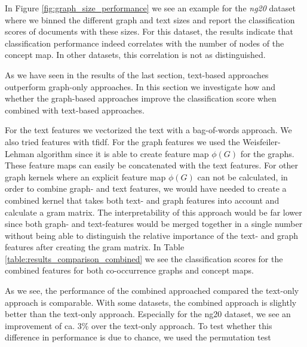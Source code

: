 In Figure \ref{fig:graph_size_performance} we see an example for the \textit{ng20} dataset where we binned the different graph and text sizes and report the classification scores of documents with these sizes.
For this dataset, the results indicate that classification performance indeed correlates with the number of nodes of the concept map.
In other datasets, this correlation is not as distinguished.





As we have seen in the results of the last section, text-based approaches outperform graph-only approaches.
In this section we investigate how and whether the graph-based approaches improve the classification score when combined with text-based approaches.

For the text features we vectorized the text with a bag-of-words approach. We also tried features with tfidf.
For the graph features we used the Weisfeiler-Lehman algorithm since it is able to create feature map $\phi(G)$ for the graphs.
These feature maps can easily be concatenated with the text features.
For other graph kernels where an explicit feature map $\phi(G)$ can not be calculated, in order to combine graph- and text features, we would have needed to create a combined kernel that takes both text- and graph features into account and calculate a gram matrix.
The interpretability of this approach would be far lower since both graph- and text-features would be merged together in a single number without being able to distinguish the relative importance of the text- and graph features after creating the gram matrix.
In Table \ref{table:results_comparison_combined} we see the classification scores for the combined features for both co-occurrence graphs and concept maps.

As we see, the performance of the combined approached compared the text-only approach is comparable.
With some datasets, the combined approach is slightly better than the text-only approach. Especially for the ng20 dataset, we see an improvement of ca. 3\% over the text-only approach.
To test whether this difference in performance is due to chance, we used the permutation test

